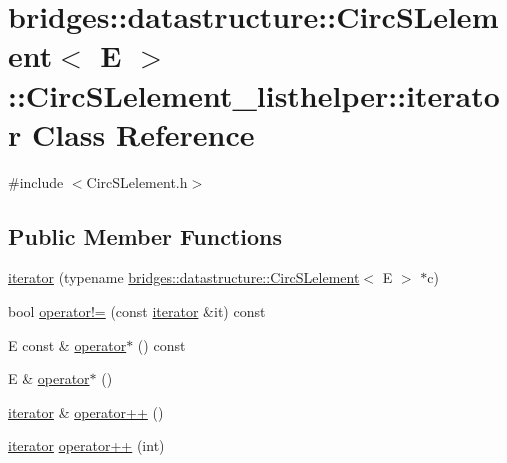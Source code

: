 \hypertarget{classbridges_1_1datastructure_1_1_circ_s_lelement_1_1_circ_s_lelement__listhelper_1_1iterator}{}\section{bridges\+:\+:datastructure\+:\+:Circ\+S\+Lelement$<$ E $>$\+:\+:Circ\+S\+Lelement\+\_\+listhelper\+:\+:iterator Class Reference}
\label{classbridges_1_1datastructure_1_1_circ_s_lelement_1_1_circ_s_lelement__listhelper_1_1iterator}


{\ttfamily \#include $<$Circ\+S\+Lelement.\+h$>$}

\subsection*{Public Member Functions}
\begin{DoxyCompactItemize}
\item 
\hyperlink{classbridges_1_1datastructure_1_1_circ_s_lelement_1_1_circ_s_lelement__listhelper_1_1iterator_a30ce9beb344082db79bb43a110d72e80}{iterator} (typename \hyperlink{classbridges_1_1datastructure_1_1_circ_s_lelement}{bridges\+::datastructure\+::\+Circ\+S\+Lelement}$<$ E $>$ $\ast$c)
\item 
bool \hyperlink{classbridges_1_1datastructure_1_1_circ_s_lelement_1_1_circ_s_lelement__listhelper_1_1iterator_af6d08569024a2bbd46be1ae18532b479}{operator!=} (const \hyperlink{classbridges_1_1datastructure_1_1_circ_s_lelement_1_1_circ_s_lelement__listhelper_1_1iterator}{iterator} \&it) const
\item 
E const  \& \hyperlink{classbridges_1_1datastructure_1_1_circ_s_lelement_1_1_circ_s_lelement__listhelper_1_1iterator_a0702b5d8507334b679e8da7afddd8878}{operator$\ast$} () const
\item 
E \& \hyperlink{classbridges_1_1datastructure_1_1_circ_s_lelement_1_1_circ_s_lelement__listhelper_1_1iterator_a3651b74c37ce98485f71d16277b98864}{operator$\ast$} ()
\item 
\hyperlink{classbridges_1_1datastructure_1_1_circ_s_lelement_1_1_circ_s_lelement__listhelper_1_1iterator}{iterator} \& \hyperlink{classbridges_1_1datastructure_1_1_circ_s_lelement_1_1_circ_s_lelement__listhelper_1_1iterator_a49858ed147cd973d97dd4bd55e4221c2}{operator++} ()
\item 
\hyperlink{classbridges_1_1datastructure_1_1_circ_s_lelement_1_1_circ_s_lelement__listhelper_1_1iterator}{iterator} \hyperlink{classbridges_1_1datastructure_1_1_circ_s_lelement_1_1_circ_s_lelement__listhelper_1_1iterator_a6bf557e320c560d6351fbdfe590bc9ae}{operator++} (int)
\end{DoxyCompactItemize}



